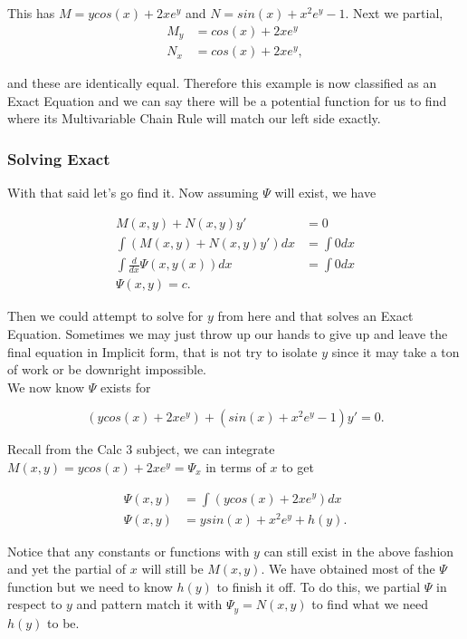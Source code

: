 \documentclass[12pt]{article}
\begin{document}
This has $M=ycos(x)+2xe^y$ and $N=sin(x)+x^2e^y-1$. Next we partial, 
\begin{align*}
    M_y&=cos(x)+2xe^y \\
    N_x&=cos(x)+2xe^y,
\end{align*}
 
and these are identically equal. Therefore this example is now classified as an Exact Equation and we can say there will be a potential function for us to find where its Multivariable Chain Rule will match our left side exactly. \\

\subsubsection{Solving Exact}

With that said let's go find it. Now assuming $\Psi$ will exist, we have 

\begin{align*}
     M(x,y)+N(x,y)y' &= 0 \\
     \int (M(x,y)+N(x,y)y')dx &= \int 0 dx \\
     \int \frac{d}{dx}\Psi(x,y(x))dx &= \int 0 dx \\
     \Psi(x,y) = c.
\end{align*}

Then we could attempt to solve for $y$ from here and that solves an Exact Equation. Sometimes we may just throw up our hands to give up and leave the final equation in Implicit form, that is not try to isolate $y$ since it may take a ton of work or be downright impossible. \\

We now know $\Psi$ exists for 

\begin{equation*}
    (ycos(x)+2xe^y)+(sin(x)+x^2e^y-1)y'=0.
\end{equation*}

Recall from the Calc 3 subject, we can integrate $M(x,y) = ycos(x)+2xe^y = \Psi_x$ in terms of $x$ to get

\begin{align*}
    \Psi(x,y) &= \int  (ycos(x)+2xe^y) dx \\
    \Psi(x,y) &= ysin(x)+x^2e^y+h(y).
\end{align*}

Notice that any constants or functions with $y$ can still exist in the above fashion and yet the partial of $x$ will still be $M(x,y)$. We have obtained most of the $\Psi$ function but we need to know $h(y)$ to finish it off. To do this, we partial $\Psi$ in respect to $y$ and pattern match it with $\Psi_y=N(x,y)$ to find what we need $h(y)$ to be.
\end{document}
